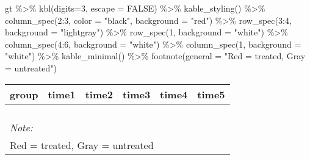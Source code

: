 \documentclass[
]{article}
\newenvironment{Shaded}{\begin{snugshade}}{\end{snugshade}}
\newcommand{\AttributeTok}[1]{\textcolor[rgb]{0.77,0.63,0.00}{#1}}
\newcommand{\ConstantTok}[1]{\textcolor[rgb]{0.00,0.00,0.00}{#1}}
\newcommand{\DecValTok}[1]{\textcolor[rgb]{0.00,0.00,0.81}{#1}}
\newcommand{\FunctionTok}[1]{\textcolor[rgb]{0.00,0.00,0.00}{#1}}
\newcommand{\NormalTok}[1]{#1}
\newcommand{\SpecialCharTok}[1]{\textcolor[rgb]{0.00,0.00,0.00}{#1}}
\newcommand{\StringTok}[1]{\textcolor[rgb]{0.31,0.60,0.02}{#1}}
\begin{document}
\begin{Shaded}
\begin{Highlighting}[]
\NormalTok{gt }\SpecialCharTok{\%\textgreater{}\%}
  \FunctionTok{kbl}\NormalTok{(}\AttributeTok{digits=}\DecValTok{3}\NormalTok{, }\AttributeTok{escape =} \ConstantTok{FALSE}\NormalTok{) }\SpecialCharTok{\%\textgreater{}\%}
  \FunctionTok{kable\_styling}\NormalTok{() }\SpecialCharTok{\%\textgreater{}\%}
  \FunctionTok{column\_spec}\NormalTok{(}\DecValTok{2}\SpecialCharTok{:}\DecValTok{3}\NormalTok{, }\AttributeTok{color =} \StringTok{"black"}\NormalTok{, }\AttributeTok{background =} \StringTok{"red"}\NormalTok{) }\SpecialCharTok{\%\textgreater{}\%}
  \FunctionTok{row\_spec}\NormalTok{(}\DecValTok{3}\SpecialCharTok{:}\DecValTok{4}\NormalTok{, }\AttributeTok{background  =} \StringTok{"lightgray"}\NormalTok{) }\SpecialCharTok{\%\textgreater{}\%}
  \FunctionTok{row\_spec}\NormalTok{(}\DecValTok{1}\NormalTok{, }\AttributeTok{background =} \StringTok{"white"}\NormalTok{) }\SpecialCharTok{\%\textgreater{}\%}
  \FunctionTok{column\_spec}\NormalTok{(}\DecValTok{4}\SpecialCharTok{:}\DecValTok{6}\NormalTok{, }\AttributeTok{background =} \StringTok{"white"}\NormalTok{) }\SpecialCharTok{\%\textgreater{}\%}
  \FunctionTok{column\_spec}\NormalTok{(}\DecValTok{1}\NormalTok{, }\AttributeTok{background =} \StringTok{"white"}\NormalTok{) }\SpecialCharTok{\%\textgreater{}\%}
  \FunctionTok{kable\_minimal}\NormalTok{() }\SpecialCharTok{\%\textgreater{}\%}
  \FunctionTok{footnote}\NormalTok{(}\AttributeTok{general =} \StringTok{"Red = treated, Gray = untreated"}\NormalTok{)}
\end{Highlighting}
\end{Shaded}

\begin{table}
\centering
\begin{tabular}[t]{>{}r|>{}r|>{}r|>{}r|>{}r|>{}r}
\hline
group & time1 & time2 & time3 & time4 & time5\\
\hline
\cellcolor{white}{2} & \cellcolor{white}{\textcolor{black}{0.631}} & \cellcolor{white}{\textcolor{black}{0.711}} & \cellcolor{white}{0.814} & \cellcolor{white}{0.846} & \cellcolor{white}{0.826}\\
\hline
\cellcolor{white}{3} & \cellcolor{red}{\textcolor{black}{0.678}} & \cellcolor{red}{\textcolor{black}{0.770}} & \cellcolor{white}{0.664} & \cellcolor{white}{0.800} & \cellcolor{white}{0.784}\\
\hline
\cellcolor{white}{4} & \cellcolor{lightgray}{\textcolor{black}{0.778}} & \cellcolor{lightgray}{\textcolor{black}{0.807}} & \cellcolor{white}{0.673} & \cellcolor{white}{0.750} & \cellcolor{white}{0.868}\\
\hline
\cellcolor{white}{5} & \cellcolor{lightgray}{\textcolor{black}{0.854}} & \cellcolor{lightgray}{\textcolor{black}{0.939}} & \cellcolor{white}{0.854} & \cellcolor{white}{0.800} & \cellcolor{white}{0.855}\\
\hline
\multicolumn{6}{l}{\rule{0pt}{1em}\textit{Note: }}\\
\multicolumn{6}{l}{\rule{0pt}{1em}Red = treated, Gray = untreated}\\
\end{tabular}
\end{table}
\end{document}
